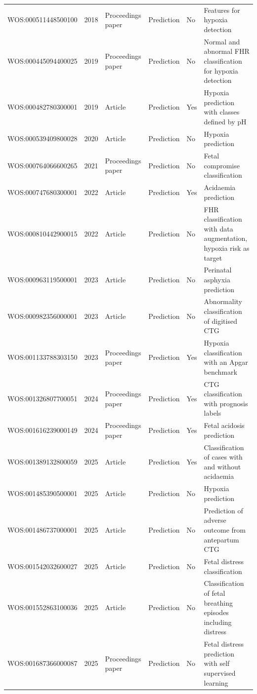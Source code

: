 \begin{longtable}{@{}p{3.5cm}rlllp{5.2cm}@{}}
WOS:000511448500100 & 2018 & Proceedings paper & Prediction & No & Features for hypoxia detection \\
WOS:000445094400025 & 2019 & Proceedings paper & Prediction & No & Normal and abnormal FHR classification for hypoxia detection \\
WOS:000482780300001 & 2019 & Article & Prediction & Yes & Hypoxia prediction with classes defined by pH \\
WOS:000539409800028 & 2020 & Article & Prediction & No & Hypoxia prediction \\
WOS:000764066600265 & 2021 & Proceedings paper & Prediction & No & Fetal compromise classification \\
WOS:000747680300001 & 2022 & Article & Prediction & Yes & Acidaemia prediction \\
WOS:000810442900015 & 2022 & Article & Prediction & No & FHR classification with data augmentation, hypoxia risk as target \\
WOS:000963119500001 & 2023 & Article & Prediction & No & Perinatal asphyxia prediction \\
WOS:000982356000001 & 2023 & Article & Prediction & No & Abnormality classification of digitised CTG \\
WOS:001133788303150 & 2023 & Proceedings paper & Prediction & Yes & Hypoxia classification with an Apgar benchmark \\
WOS:001326807700051 & 2024 & Proceedings paper & Prediction & Yes & CTG classification with prognosis labels \\
WOS:001616239000149 & 2024 & Proceedings paper & Prediction & Yes & Fetal acidosis prediction \\
WOS:001389132800059 & 2025 & Article & Prediction & Yes & Classification of cases with and without acidaemia \\
WOS:001485390500001 & 2025 & Article & Prediction & No & Hypoxia prediction \\
WOS:001486737000001 & 2025 & Article & Prediction & No & Prediction of adverse outcome from antepartum CTG \\
WOS:001542032600027 & 2025 & Article & Prediction & No & Fetal distress classification \\
WOS:001552863100036 & 2025 & Article & Prediction & No & Classification of fetal breathing episodes including distress \\
WOS:001687366000087 & 2025 & Proceedings paper & Prediction & No & Fetal distress prediction with self supervised learning \\

\end{longtable}
